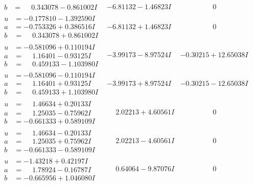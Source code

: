 \documentclass[1p]{elsarticle_modified}
\theoremstyle{definition}
\begin{document}
$$\begin{array}{c|c|c}
\begin{aligned}
b &= \phantom{-}0.343078 - 0.861002 I\end{aligned}
 & -6.81132 - 1.46823 I & \phantom{-0.000000 } 0 \\ \hline\begin{aligned}
u &= -0.177810 - 1.392590 I \\
a &= -0.753326 + 0.386516 I \\
b &= \phantom{-}0.343078 + 0.861002 I\end{aligned}
 & -6.81132 + 1.46823 I & \phantom{-0.000000 } 0 \\ \hline\begin{aligned}
u &= -0.581096 + 0.110194 I \\
a &= \phantom{-}1.16401 - 0.93125 I \\
b &= \phantom{-}0.459133 - 1.103980 I\end{aligned}
 & -3.99173 - 8.97524 I & -0.30215 + 12.65038 I \\ \hline\begin{aligned}
u &= -0.581096 - 0.110194 I \\
a &= \phantom{-}1.16401 + 0.93125 I \\
b &= \phantom{-}0.459133 + 1.103980 I\end{aligned}
 & -3.99173 + 8.97524 I & -0.30215 - 12.65038 I \\ \hline\begin{aligned}
u &= \phantom{-}1.46634 + 0.20133 I \\
a &= \phantom{-}1.25035 - 0.75962 I \\
b &= -0.661333 + 0.589109 I\end{aligned}
 & \phantom{-}2.02213 + 4.60561 I & \phantom{-0.000000 } 0 \\ \hline\begin{aligned}
u &= \phantom{-}1.46634 - 0.20133 I \\
a &= \phantom{-}1.25035 + 0.75962 I \\
b &= -0.661333 - 0.589109 I\end{aligned}
 & \phantom{-}2.02213 - 4.60561 I & \phantom{-0.000000 } 0 \\ \hline\begin{aligned}
u &= -1.43218 + 0.42197 I \\
a &= \phantom{-}1.78924 - 0.16787 I \\
b &= -0.665956 + 1.046080 I\end{aligned}
 & \phantom{-}0.64064 - 9.87076 I & \phantom{-0.000000 } 0 \\ \hline\begin{aligned}

\end{aligned}
\end{array}$$
\end{document}
